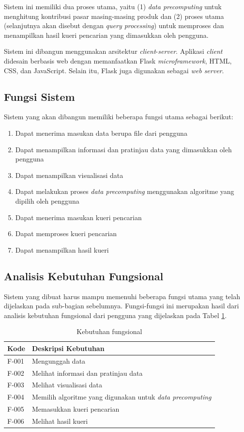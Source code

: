 Sistem ini memiliki dua proses utama, yaitu (1) \textit{data precomputing} untuk menghitung kontribusi pasar masing-masing produk dan (2) proses utama (selanjutnya akan disebut dengan \textit{query processing}) untuk memproses dan menampilkan hasil kueri pencarian yang dimasukkan oleh pengguna.

Sistem ini dibangun menggunakan arsitektur \textit{client}-\textit{server}. Aplikasi \textit{client} didesain berbasis web dengan memanfaatkan Flask \textit{microframework}, HTML, CSS, dan JavaScript. Selain itu, Flask juga digunakan sebagai \textit{web server}. 

\pagebreak
\subsection{Fungsi Sistem}
\tab Sistem yang akan dibangun memiliki beberapa fungsi utama sebagai berikut:
\begin{enumerate}
	\item Dapat menerima masukan data berupa file dari pengguna
	\item Dapat menampilkan informasi dan pratinjau data yang dimasukkan oleh pengguna
	\item Dapat menampilkan visualisasi data
	\item Dapat melakukan proses \textit{data precomputing} menggunakan algoritme yang dipilih oleh pengguna
	\item Dapat menerima masukan kueri pencarian 
	\item Dapat memproses kueri pencarian
	\item Dapat menampilkan hasil kueri
\end{enumerate}

\subsection{Analisis Kebutuhan Fungsional}
\tab Sistem yang dibuat harus mampu memenuhi beberapa fungsi utama yang telah dijelaskan pada sub-bagian sebelumnya. Fungsi-fungsi ini merupakan hasil dari analisis kebutuhan fungsional dari pengguna yang dijelaskan pada Tabel \ref{tab:kebutuhan-fungsional}.

\begin{table}[H]
	\centering
	\begin{tabular}{ | p{2cm} | p{7cm} | }
		\hline
		\textbf{Kode} & \textbf{Deskripsi Kebutuhan} \\ \hline \hline
		F-001 & Mengunggah data \\ \hline
		F-002 & Melihat informasi dan pratinjau data \\ \hline
		F-003 & Melihat visualisasi data  \\ \hline
		F-004 & Memilih algoritme yang digunakan untuk \textit{data precomputing}\\ \hline
		F-005 & Memasukkan kueri pencarian \\ \hline
		F-006 & Melihat hasil kueri \\ \hline
	\end{tabular} \caption{Kebutuhan fungsional}
	\label{tab:kebutuhan-fungsional}
\end{table}

